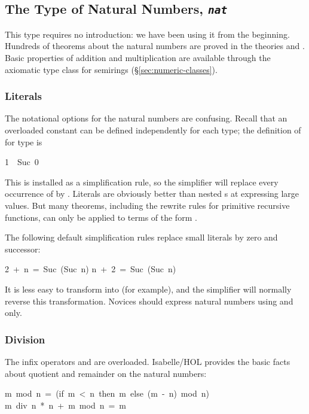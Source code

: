 \subsection{The Type of Natural Numbers, {\tt\slshape nat}}

%
This type requires no introduction: we have been using it from the
beginning.  Hundreds of theorems about the natural numbers are
proved in the theories  and .
Basic properties of addition and multiplication are available through the
axiomatic type class for semirings (\S\ref{sec:numeric-classes}).

\subsubsection{Literals}
%
The notational options for the natural  numbers are confusing.  Recall that an
overloaded constant can be defined independently for each type; the definition
of  for type  is
\begin{isabelle}
1\ \isasymequiv\ Suc\ 0
\end{isabelle}
This is installed as a simplification rule, so the simplifier will replace
every occurrence of  by .  Literals are obviously
better than nested s at expressing large values.  But many theorems,
including the rewrite rules for primitive recursive functions, can only be
applied to terms of the form .

The following default  simplification rules replace
small literals by zero and successor:
\begin{isabelle}
2\ +\ n\ =\ Suc\ (Suc\ n)
\isanewline
n\ +\ 2\ =\ Suc\ (Suc\ n)
\end{isabelle}
It is less easy to transform  into  (for example), and
the simplifier will normally reverse this transformation.  Novices should
express natural numbers using  and  only.

\subsubsection{Division}
%
The infix operators  and  are overloaded.
Isabelle/HOL provides the basic facts about quotient and remainder
on the natural numbers:
\begin{isabelle}
m\ mod\ n\ =\ (if\ m\ <\ n\ then\ m\ else\ (m\ -\ n)\ mod\ n)
\isanewline
m\ div\ n\ *\ n\ +\ m\ mod\ n\ =\ m%
\end{isabelle}

